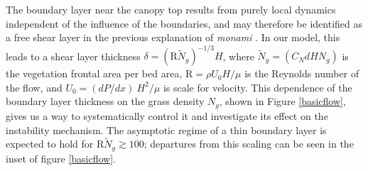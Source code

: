 \documentclass[aps,prl,reprint,twocolumn,showpacs,superscriptaddress,10pt]{revtex4-1}  %
\newcommand{\Rey}{\text{R}}
\newcommand{\Ndg}{\tilde{N}_g}
\newcommand{\monami}{\textit{monami }}
\begin{document}
The boundary layer near the canopy top results from purely local dynamics independent of the influence of the boundaries, and may therefore be identified as a free shear layer\cite{Ghisal02} in the previous explanation of \monami. 
In our model, this leads to a shear layer thickness $\delta = (\Rey\Ndg)^{-1/3} H$, where $\Ndg = \left(C_N d H N_g\right)$ is the vegetation frontal area per bed area, $\Rey=\rho U_0 H/\mu$ is the Reynolds number of the flow, and $U_0 = {(dP/dx)~H^2}/{\mu}$ is scale for velocity. 
This dependence of the boundary layer thickness on the grass density $N_g$, shown in Figure \ref{basicflow}, gives us a way to systematically control it and investigate its effect on the instability mechanism.
The asymptotic regime of a thin boundary layer is expected to hold for $\Rey \Ndg \gtrsim 100$; departures from this scaling can be seen in the inset of figure \ref{basicflow}.
\end{document}
